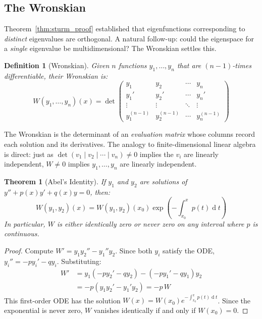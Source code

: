 \documentclass[12pt,a4paper]{report}
\DeclareMathOperator{\deriv}{d}
\theoremstyle{thms}
\newtheorem{theorem}{Theorem}[section]
\theoremstyle{defns}
\newtheorem{definition}{Definition}[section]
\begin{document}
\subsection{The Wronskian}
\label{sec:wronskian}

Theorem~\ref{thm:sturm_proof} established that eigenfunctions corresponding to \textit{distinct} eigenvalues are orthogonal. A natural follow-up: could the eigenspace for a \textit{single} eigenvalue be multidimensional? The Wronskian settles this.

\begin{definition}[Wronskian]
    Given $n$ functions $y_1, \ldots, y_n$ that are $(n-1)$-times differentiable, their Wronskian is:
    \begin{equation}
        W(y_1, \ldots, y_n)(x) = \det\begin{pmatrix}
            y_1       & y_2       & \cdots & y_n       \\
            y_1'      & y_2'      & \cdots & y_n'      \\
            \vdots    & \vdots    & \ddots & \vdots    \\
            y_1^{(n-1)} & y_2^{(n-1)} & \cdots & y_n^{(n-1)}
        \end{pmatrix}
    \end{equation}
\end{definition}

The Wronskian is the determinant of an \textit{evaluation matrix} whose columns record each solution and its derivatives. The analogy to finite-dimensional linear algebra is direct: just as $\det(v_1 \mid v_2 \mid \cdots \mid v_n) \neq 0$ implies the $v_i$ are linearly independent, $W \neq 0$ implies $y_1, \ldots, y_n$ are linearly independent.

\begin{theorem}[Abel's Identity]
    If $y_1$ and $y_2$ are solutions of $y'' + p(x)y' + q(x)y = 0$, then:
    \begin{equation}
        W(y_1, y_2)(x) = W(y_1, y_2)(x_0)\exp\left(-\int_{x_0}^{x} p(t)\deriv{t}\right)
        \label{eq:abel}
    \end{equation}
    In particular, $W$ is either identically zero or never zero on any interval where $p$ is continuous.
    \label{thm:abel}
\end{theorem}

\begin{proof}
    Compute $W' = y_1 y_2'' - y_1'' y_2$. Since both $y_i$ satisfy the ODE, $y_i'' = -p y_i' - q y_i$. Substituting:
    \begin{align}
        W' &= y_1(-p y_2' - q y_2) - (-p y_1' - q y_1)y_2 \\
           &= -p(y_1 y_2' - y_1' y_2) = -p\, W
    \end{align}
    This first-order ODE has the solution $W(x) = W(x_0)e^{-\int_{x_0}^{x} p(t)\deriv{t}}$. Since the exponential is never zero, $W$ vanishes identically if and only if $W(x_0) = 0$.
\end{proof}
\end{document}

